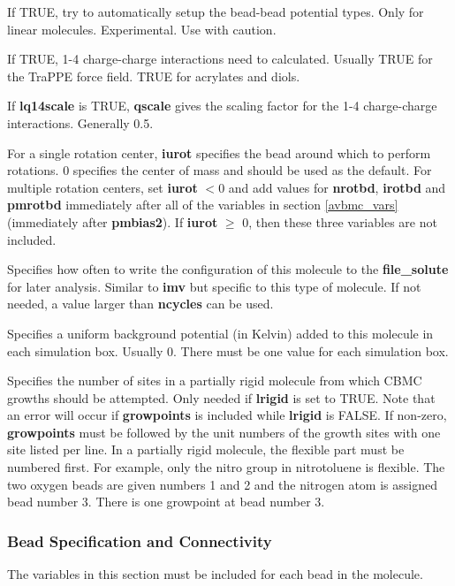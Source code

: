 \documentclass[12pt,letterpaper]{article}
\begin{document}
 If TRUE, try to automatically setup
the bead-bead potential types. Only for linear molecules.
Experimental. Use with caution.

 If TRUE, 1-4 charge-charge
interactions need to calculated. Usually TRUE for the TraPPE
force field. TRUE for acrylates and diols.

 If {\bf lq14scale} is TRUE, {\bf
  qscale} gives the scaling factor for the 1-4 charge-charge
interactions. Generally 0.5.

 For a single rotation center, {\bf
  iurot} specifies the bead around which to perform
rotations. 0 specifies the center of mass and should be used
as the default. For multiple rotation centers, set {\bf
  iurot} $< 0$ and add values for \textbf{nrotbd},
\textbf{irotbd} and \textbf{pmrotbd} immediately after all
of the variables in section \ref{avbmc_vars} (immediately
after {\bf pmbias2}). If {\bf iurot} $\ge$ 0, then these
three variables are not included.

 Specifies how often to write the
configuration of this molecule to the {\bf file\_solute} for
later analysis. Similar to {\bf imv} but specific to this
type of molecule. If not needed, a value larger than {\bf
  ncycles} can be used.

 Specifies a uniform background potential
(in Kelvin) added to this molecule in each simulation box.
Usually 0. There must be one value for each simulation box.

 Specifies the number of sites in
a partially rigid molecule from which CBMC growths should be
attempted. Only needed if {\bf lrigid} is set to TRUE. Note
that an error will occur if {\bf growpoints} is included
while {\bf lrigid} is FALSE. If non-zero, {\bf growpoints}
must be followed by the unit numbers of the growth sites
with one site listed per line. In a partially rigid
molecule, the flexible part must be numbered first. For
example, only the nitro group in nitrotoluene is flexible.
The two oxygen beads are given numbers 1 and 2 and the
nitrogen atom is assigned bead number 3. There is one
growpoint at bead number 3.

\subsubsection{Bead Specification and Connectivity}
\label{beadspec}
The variables in this section must be included for each bead
in the molecule.
\end{document}
